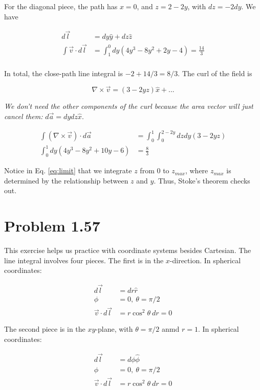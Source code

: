 \documentclass[10pt]{article}
\begin{document}
For the diagonal piece, the path has $x = 0$, and $z = 2 - 2y$, with $dz = - 2 dy$.  We have

\begin{align}
d\vec{l} &= dy \hat{y} + dz \hat{z} \\
\int \vec{v} \cdot d\vec{l} &= \int_{1}^{0} dy \left( 4 y^3 - 8y^2 +2 y - 4\right) = \frac{14}{3} \\
\end{align}

In total, the close-path line integral is $\boxed{-2 + 14/3 = 8/3}$.  The curl of the field is

\begin{equation}
\nabla \times \vec{v} = (3 - 2 y z)\hat{x} + ...
\end{equation}

\textit{We don't need the other components of the curl because the area vector will just cancel them:} $d\vec{a} = dy dz \hat{x}$.

\begin{align}
\int (\nabla \times \vec{v}) \cdot d\vec{a} &= \int_{0}^{1} \int_{0}^{2 - 2y} dz dy (3 - 2 y z) \label{eq:limit} \\
\int_{0}^{1} dy \left( 4y^3 - 8y^2 + 10y -6 \right) &= \frac{8}{3}
\end{align}

Notice in Eq. \ref{eq:limit} that we integrate $z$ from $0$ to $z_{max}$, where $z_{max}$ is determined by the relationship between $z$ and $y$.  Thus, Stoke's theorem checks out.

\section{Problem 1.57}

This exercise helps us practice with coordinate systems besides Cartesian.  The line integral involves four pieces.  The first is in the $x$-direction.  In spherical coordinates:

\begin{align}
d\vec{l} &= dr \hat{r} \\
\phi &= 0, ~ \theta = \pi/2 \\
\vec{v} \cdot d\vec{l} &= r \cos^2\theta ~ dr = 0
\end{align}

The second piece is in the $xy$-plane, with $\theta = \pi/2$ anmd $r = 1$.  In spherical coordinates:

\begin{align}
d\vec{l} &= d\phi \hat{\phi} \\
\phi &= 0, ~ \theta = \pi/2 \\
\vec{v} \cdot d\vec{l} &= r \cos^2\theta ~ dr = 0
\end{align}
\end{document}
